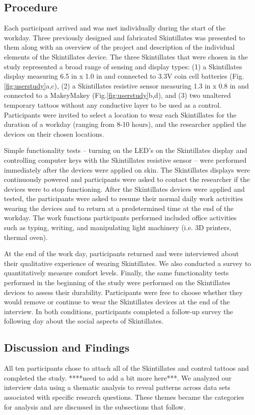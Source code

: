 \documentclass{sigchi}
\begin{document}
\subsection {Procedure}
Each participant arrived and was met individually during the start of the workday.  Three previously designed and fabricated Skintillates was presented to them along with an overview of the project and description of the individual elements of the Skintillates device.  The three Skintillates that were chosen in the study represented a broad range of sensing and display types: (1) a Skintillates display measuring 6.5 in x 1.0 in and connected to 3.3V coin cell batteries (Fig.\ref{fig:userstudy}a,c), (2) a Skintillates resistive sensor measuring 1.3 in x 0.8 in and connected to a MakeyMakey (Fig.\ref{fig:userstudy}b,d), and (3) two unaltered temporary tattoos without any conductive layer to be used as a control. Participants were invited to select a location to wear each Skintillates for the duration of a workday (ranging from 8-10 hours), and the researcher applied the devices on their chosen locations. 

Simple functionality tests – turning on the LED’s on the Skintillates display and controlling computer keys with the Skintillates resistive sensor – were performed immediately after the devices were applied on skin. The Skintillates displays were continuously powered and participants were asked to contact the researcher if the devices were to stop functioning. After the Skintillates devices were applied and tested, the participants were asked to resume their normal daily work activities wearing the devices and to return at a predetermined time at the end of the workday. The work functions participants performed included office activities such as typing, writing, and manipulating light machinery (i.e. 3D printers, thermal oven).

At the end of the work day, participants returned and were interviewed about their qualitative experience of wearing Skintillates.  We also conducted a survey to  quantitatively measure comfort levels.   Finally, the same  functionality tests performed in the beginning of the study were performed on the Skintillates devices to assess their durability. Participants were free to choose whether they would remove or continue to wear the Skintillates devices at the end of the interview.    In both conditions, participants completed a follow-up survey the following day about the social aspects of Skintillates.
\subsection {Discussion and Findings}
All ten participants chose to attach all of the Skintillates and control tattoos and completed the study. ****need to add a bit more here***.  We analyzed our interview data using a thematic analysis to reveal patterns across data sets associated with specific research questions. These themes became the categories for analysis and are discussed in the subsections that follow.
\end{document}
